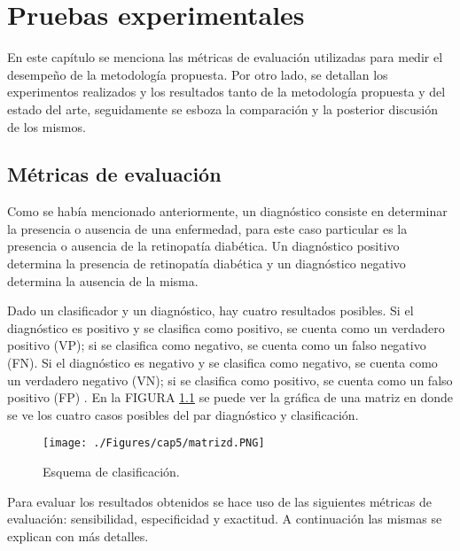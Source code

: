 \newpage{\ } 
\thispagestyle{empty} 

\chapter{Pruebas experimentales}
En este capítulo se menciona las métricas de evaluación utilizadas para medir el desempeño de la metodología propuesta. Por otro lado, se detallan los experimentos realizados y los  resultados tanto de la metodología propuesta y  del estado del arte, seguidamente se esboza la comparación y la posterior discusión de los mismos.


\section{Métricas de evaluación}

Como se había mencionado anteriormente, un diagnóstico consiste en determinar la presencia o ausencia de una enfermedad, para este caso particular es la  presencia o ausencia de la retinopatía diabética. Un diagnóstico positivo determina la presencia de retinopatía diabética y un diagnóstico negativo determina la ausencia de la misma.

Dado un clasificador y un diagnóstico, hay cuatro resultados posibles. Si el diagnóstico es positivo y se clasifica como positivo, se cuenta como un verdadero positivo (VP); si se clasifica como negativo, se cuenta como un falso negativo (FN). Si el diagnóstico es negativo y se clasifica como negativo, se cuenta como un verdadero negativo (VN); si se clasifica como positivo, se cuenta como un falso positivo (FP) \cite{fawcett2006introduction}. En la FIGURA \ref{fig:clasificacion} se puede ver la gráfica de una matriz en donde se ve los cuatro casos posibles del par diagnóstico y clasificación. 

\begin{figure}
	\centering
		\texttt{[image: ./Figures/cap5/matrizd.PNG]}
	\caption{Esquema de clasificación.}

	\label{fig:clasificacion}
\end{figure}

Para evaluar los resultados obtenidos se hace uso de las siguientes métricas de evaluación: sensibilidad, especificidad y exactitud. A continuación las mismas se explican con más detalles.  
